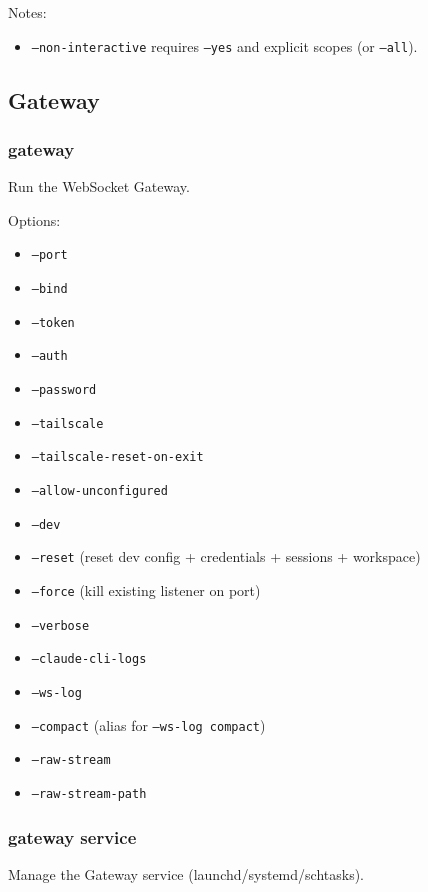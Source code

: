 Notes:

\begin{itemize}
  \item \texttt{--non-interactive} requires \texttt{--yes} and explicit scopes (or \texttt{--all}).
\end{itemize}


\subsection{Gateway}


\subsubsection{gateway}


Run the WebSocket Gateway.

Options:

\begin{itemize}
  \item \texttt{--port }
  \item \texttt{--bind }
  \item \texttt{--token }
  \item \texttt{--auth }
  \item \texttt{--password }
  \item \texttt{--tailscale }
  \item \texttt{--tailscale-reset-on-exit}
  \item \texttt{--allow-unconfigured}
  \item \texttt{--dev}
  \item \texttt{--reset} (reset dev config + credentials + sessions + workspace)
  \item \texttt{--force} (kill existing listener on port)
  \item \texttt{--verbose}
  \item \texttt{--claude-cli-logs}
  \item \texttt{--ws-log }
  \item \texttt{--compact} (alias for \texttt{--ws-log compact})
  \item \texttt{--raw-stream}
  \item \texttt{--raw-stream-path }
\end{itemize}


\subsubsection{gateway service}


Manage the Gateway service (launchd/systemd/schtasks).

